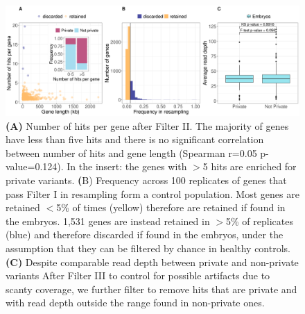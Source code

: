 \begin{figure}[ht]
\centering
\includegraphics[width=\linewidth]{fig/filters_embryos.png}
\caption{\textbf{} \textbf{(A)} Number of hits per gene after Filter II. The majority of genes have less than five hits and there is no significant correlation between number of hits and gene length (Spearman r=0.05 p-value=0.124). In the insert: the genes with $>$5 hits are enriched for private variants. \textbf(B) Frequency across 100 replicates of genes that pass Filter I in resampling form a control population. Most genes are retained $<$5\% of times (yellow) therefore are retained if found in the embryos. 1,531 genes are instead retained in $>$5\% of replicates (blue) and therefore discarded if found in the embryos, under the assumption that they can be filtered by chance in healthy controls. \textbf{(C)} Despite comparable read depth between private and non-private variants After Filter III to control for possible artifacts due to scanty coverage, we further filter to remove hits that are private and with read depth outside the range found in non-private ones.}
\label{fig:filters}
\end{figure}

